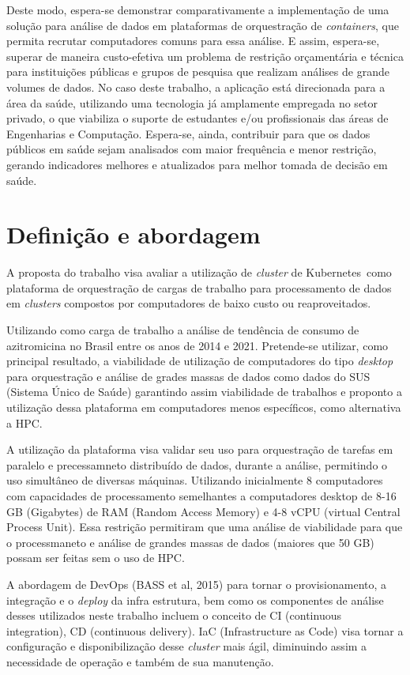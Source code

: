 Deste modo, espera-se demonstrar comparativamente a implementação de uma solução para análise de dados em plataformas de orquestração de \emph{containers}, que permita recrutar computadores comuns para essa análise. E assim, espera-se, superar de maneira custo-efetiva um problema de restrição orçamentária e técnica para instituições públicas e grupos de pesquisa que realizam análises de grande volumes de dados. No caso deste trabalho, a aplicação está direcionada para a área da saúde, utilizando uma tecnologia já amplamente empregada no setor privado, o que viabiliza o suporte de estudantes e/ou profissionais das áreas de Engenharias e Computação. Espera-se, ainda, contribuir para que os dados públicos em saúde sejam analisados com  maior frequência e menor restrição, gerando indicadores melhores e atualizados para melhor tomada de decisão em saúde.

\section{Definição e abordagem}
\label{sec:abordagem}

A proposta do trabalho visa avaliar a utilização de \emph{cluster} de Kubernetes\textregistered \ como plataforma de orquestração de cargas de trabalho para processamento de dados em \emph{clusters }compostos por computadores de baixo custo ou reaproveitados.

Utilizando como carga de trabalho a análise de tendência de consumo de azitromicina no Brasil entre os anos de 2014 e 2021. Pretende-se utilizar, como principal resultado, a viabilidade de utilização de computadores do tipo \emph{desktop} para orquestração e análise de grades massas de dados como dados do SUS (Sistema Único de Saúde) garantindo assim viabilidade de trabalhos e proponto a utilização dessa plataforma em computadores menos específicos, como alternativa a HPC.

A utilização da plataforma visa validar seu uso para orquestração de tarefas em paralelo e precessamneto distribuído de dados, durante a análise, permitindo o uso simultâneo de diversas máquinas. Utilizando inicialmente 8 computadores com capacidades de processamento semelhantes a computadores desktop de 8-16 GB (Gigabytes) de RAM (Random Access Memory) e 4-8 vCPU (virtual Central Process Unit). Essa restrição  permitiram que uma análise de viabilidade para que o processmaneto e análise de grandes massas de dados (maiores que 50 GB) possam ser feitas sem o uso de HPC.

A abordagem de DevOps (BASS et al, 2015) para tornar o provisionamento, a integração e o \emph{deploy} da infra estrutura, bem como os componentes de análise desses utilizados neste trabalho incluem o conceito de CI (continuous integration), CD (continuous delivery).  IaC (Infrastructure as Code) visa tornar a configuração e disponibilização desse \emph{cluster} mais ágil, diminuindo assim a necessidade de operação e também de sua manutenção.

